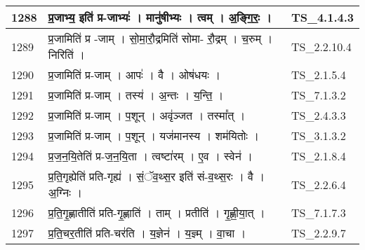 \documentclass[17pt]{extarticle}
\begin{document}
\begin{longtable}{||p{0.4in}||p{4.9in}||p{0.9in}||}
    \hline
        
    1288 & प्र॒जाभ्य॒ इति॑ प्र{-}जाभ्यः॑   ।   मानु॑षीभ्यः   ।   त्वम्   ।   अ॒ङ्गि॒रः॒   ।    & TS\_4.1.4.3       \\
    
    \hline
        
    1289 & प्र॒जामिति॑ प्र {-}जाम्   ।   सो॒मा॒रौ॒द्रमिति॑ सोमा{-} रौ॒द्रम्   ।   च॒रुम्   ।   निरिति॑   ।    & TS\_2.2.10.4       \\
    
    \hline
        
    1290 & प्र॒जामिति॑ प्र{-}जाम्   ।   आपः॑   ।   वै   ।   ओष॑धयः   ।    & TS\_2.1.5.4       \\
    
    \hline
        
    1291 & प्र॒जामिति॑ प्र{-}जाम्   ।   तस्य॑   ।   अ॒न्तः   ।   य॒न्ति॒   ।    & TS\_7.1.3.2       \\
    
    \hline
        
    1292 & प्र॒जामिति॑ प्र{-}जाम्   ।   प॒शून्   ।   अवृ॑ञ्जत   ।   तस्मा᳚त्   ।    & TS\_2.4.3.3       \\
    
    \hline
        
    1293 & प्र॒जामिति॑ प्र{-}जाम्   ।   प॒शून्   ।   यज॑मानस्य   ।   शम॑यितोः   ।    & TS\_3.1.3.2       \\
    
    \hline
        
    1294 & प्र॒ज॒न॒यि॒तेति॑ प्र{-}ज॒न॒यि॒ता   ।   त्वष्टा॑रम्   ।   ए॒व   ।   स्वेन॑   ।    & TS\_2.1.8.4       \\
    
    \hline
        
    1295 & प्र॒ति॒गृह्येति॑ प्रति{-}गृह्य॑   ।   सं॒ॅव॒थ्स॒र इति॑ सं{-}व॒थ्स॒रः   ।   वै   ।   अ॒ग्निः   ।    & TS\_2.2.6.4       \\
    
    \hline
        
    1296 & प्र॒ति॒गृ॒ह्णातीति॑ प्रति{-}गृ॒ह्णाति॑   ।   ताम्   ।   प्रतीति॑   ।   गृ॒ह्णी॒या॒त्   ।    & TS\_7.1.7.3       \\
    
    \hline
        
    1297 & प्र॒ति॒चर॒तीति॑ प्रति{-}चर॑ति   ।   य॒ज्ञेन॑   ।   य॒ज्ञ्म्   ।   वा॒चा   ।    & TS\_2.2.9.7       \\
    

\end{longtable}
\end{document}
